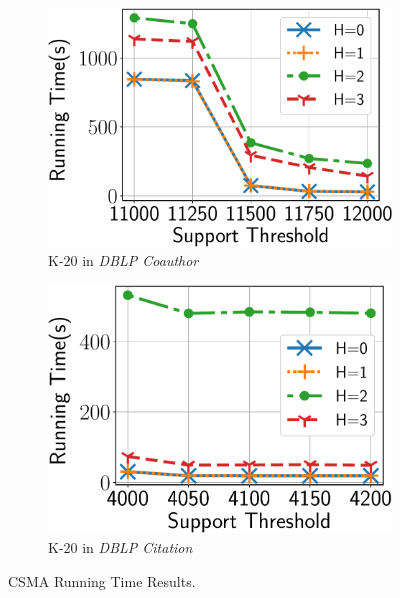 \begin{figure}
\begin{subfigure}[b]{0.25\textwidth}
		\includegraphics[keepaspectratio, scale=0.24, angle=0]{img2/coauthordblp/coauthordblp_running_time_nobound.pdf}
		\caption{\scriptsize {\sf K-$20$} in {\em DBLP Coauthor}}
		\label{fig:coauthordblp_nosb}
	\end{subfigure}%
	\begin{subfigure}[b]{0.25\textwidth}
		\includegraphics[scale=0.24, angle=0]{img2/citationdblp/citationdblp_running_time_nobound.pdf}
		\caption{\scriptsize {\sf K-$20$} in {\em DBLP Citation}}
		\label{fig:citation_nosb}
	\end{subfigure}%
	\vspace{-2mm}
	\caption{\scriptsize CSMA Running Time Results.}
	\label{fig:approx_nobound}
	\vspace{-4mm}
	\end{figure}

